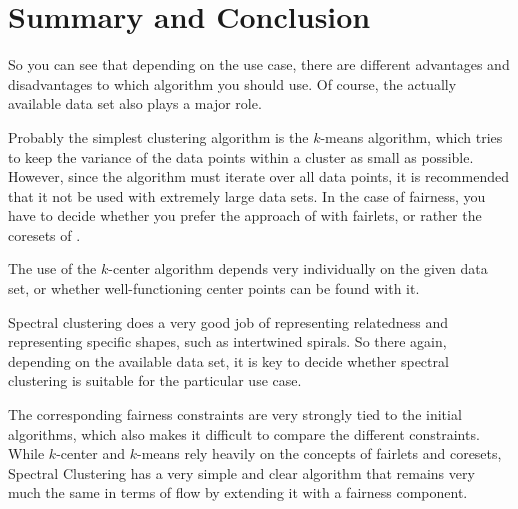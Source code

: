 \section{Summary and Conclusion}

So you can see that depending on the use case, there are different advantages and disadvantages to which algorithm you should use. Of course, the actually available data set also plays a major role.

Probably the simplest clustering algorithm is the $k$-means algorithm, which tries to keep the variance of the data points within a cluster as small as possible. However, since the algorithm must iterate over all data points, it is recommended that it not be used with extremely large data sets.
In the case of fairness, you have to decide whether you prefer the approach of \textcite{Chierichetti2018} with fairlets, or rather the coresets of \textcite{Schmidt2018}.

The use of the $k$-center algorithm depends very individually on the given data set, or whether well-functioning center points can be found with it.

Spectral clustering does a very good job of representing relatedness and representing specific shapes, such as intertwined spirals. So there again, depending on the available data set, it is key to decide whether spectral clustering is suitable for the particular use case.

The corresponding fairness constraints are very strongly tied to the initial algorithms, which also makes it difficult to compare the different constraints. While $k$-center and $k$-means rely heavily on the concepts of fairlets and coresets, Spectral Clustering has a very simple and clear algorithm that remains very much the same in terms of flow by extending it with a fairness component.
